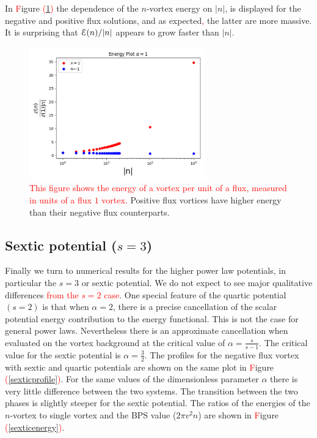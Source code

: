 In \textcolor{red}{F}igure \textcolor{red}{(}\ref{positiveenergy}\textcolor{red}{)} the dependence of the $n$-vortex energy on $|n|$, is displayed for the negative and positive flux solutions, and as expected\textcolor{red}{,} the latter are more massive.  It is surprising  that ${\cal E }(n)/|n|$ appears to grow faster than $|n|$.
\begin{figure}[H]
\begin{center}
 \includegraphics[width=3in]{Chapter_2_Folder_1912.11321/figures/positive_n_energy.pdf}
     \caption[Energy per flux for positive winding number $n$.]{{\small \textcolor{red}{This figure shows the energy of a vortex per unit of a flux, measured in units of a flux $1$ vortex.}  Positive flux vortices have higher energy than their negative flux counterparts.}} \label{positiveenergy}
    \end{center}
\end{figure}
\subsection{Sextic potential ($s=3$)}
Finally we turn to numerical results for the higher power law potentials, in particular the $s=3$
or sextic potential. We do not expect to see major qualitative differences \textcolor{red}{from the $s=2$ case}. One special feature of the quartic potential $(s=2)$ is that when $\alpha=2$, there is a precise cancellation of the scalar potential energy contribution to the energy functional. This is not the case for general power laws. Nevertheless there is an approximate cancellation when evaluated on the vortex background at the critical value of $\alpha = \frac{s}{s-1}$.   The critical value for the sextic potential is $\alpha = \frac32$.
The profiles for the negative flux vortex with sextic and quartic potentials are shown on the same plot in \textcolor{red}{F}igure \textcolor{red}{(}\ref{sexticprofile}\textcolor{red}{)}. For the same values of the dimensionless parameter $\alpha$ there is very little difference between the two systems. The transition between the two phases is slightly steeper for the sextic potential. The ratios of the energies of the $n$-vortex to single vortex \colorbox{red}{ } and the BPS value ($2\pi v^2 n$) are shown in \textcolor{red}{F}igure \textcolor{red}{(}\ref{sexticenergy}\textcolor{red}{)}.


